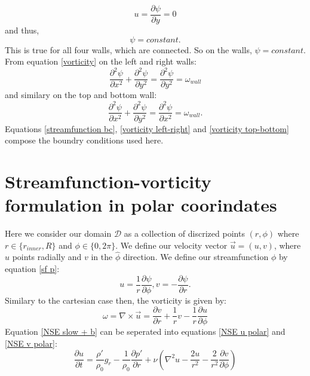 \documentclass{article}
\begin{document}
\begin{equation}
	u = \frac{\partial \psi}{\partial y} = 0
\end{equation}
and thus,
\begin{equation}
	\psi = constant.
	\label{streamfunction bc}
\end{equation}
This is true for all four walls, which are connected. So on the walls, $\psi = constant$.
From equation \ref{vorticity} on the left and right walls:
\begin{equation}
	\frac{\partial^2 \psi}{\partial x^2} + \frac{\partial^2 \psi}{\partial y^2} = \frac{\partial^2 \psi}{\partial y^2}= \omega_{wall}
	\label{vorticity left-right}
\end{equation}
and similary on the top and bottom wall:
\begin{equation}
	\frac{\partial^2 \psi}{\partial x^2} + \frac{\partial^2 \psi}{\partial y^2} = \frac{\partial^2 \psi}{\partial x^2}= \omega_{wall}.
	\label{vorticity top-bottom}
\end{equation}
Equations \ref{streamfunction bc}, \ref{vorticity left-right} and \ref{vorticity top-bottom} compose the boundry conditions used here.


\section*{Streamfunction-vorticity formulation in polar coorindates}
Here we consider our domain $\mathcal{D}$ as a collection of discrized points $(r, \phi)$ where $r\in \{ r_{inner}, R\}$ and $\phi \in \{ 0, 2 \pi\}$. We define our velocity vector $\vec{u} = (u,v)$, where $u$ points radially and $v$ in the $\hat{\phi}$ direction. We define our streamfunction $\phi$ by equation \ref{sf p}:
\begin{equation}
	u = \frac{1}{r} \frac{\partial \psi}{\partial \phi}, v = - \frac{\partial \psi}{\partial r}.
	\label{sf p}
\end{equation}
Similary to the cartesian case then, the vorticity is given by:
\begin{equation}
	\omega = \nabla \times \vec{u} = \frac{\partial v}{\partial r} + \frac{1}{r} v - \frac{1}{r} \frac{\partial u}{\partial \phi}
	\label{polar vorticity}
\end{equation}
Equation \ref{NSE slow + b} can be seperated into equations \ref{NSE u polar} and \ref{NSE v polar}:
\begin{equation}
	\frac{\partial u}{\partial t} = \frac{\rho'}{\rho_0} g_r - \frac{1}{\rho_0} \frac{\partial p'}{\partial r} + \nu ( \nabla^2 u - \frac{2 u}{r^2} - \frac{2}{r^2} \frac{\partial v}{\partial \phi})
	\label{NSE u polar}
\end{equation}
\end{document}
